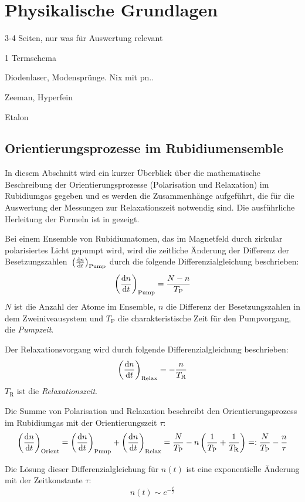 \section{Physikalische Grundlagen}

3-4 Seiten, nur was für Auswertung relevant

1 Termschema

Diodenlaser, Modensprünge. Nix mit pn..

Zeeman, Hyperfein

Etalon

\subsection{Orientierungsprozesse im Rubidiumensemble}
In diesem Abschnitt wird ein kurzer Überblick über die mathematische Beschreibung der Orientierungsprozesse
(Polarisation und Relaxation) im Rubidiumgas gegeben und es werden die Zusammenhänge aufgeführt, die für die
Auswertung der Messungen zur Relaxationszeit notwendig sind.
Die ausführliche Herleitung der Formeln ist in \cite{staatsex} gezeigt.

Bei einem Ensemble von Rubidiumatomen, das im Magnetfeld durch zirkular polarisiertes Licht gepumpt wird,
wird die zeitliche Änderung der Differenz der Besetzungszahlen~$\left(\frac{\mathrm{d} n}{\mathrm{d} t}\right)_{\text{Pump}}$
durch die folgende Differenzialgleichung beschrieben:
\begin{equation}
  \left(\frac{\mathrm{d} n}{\mathrm{d} t}\right)_{\text{Pump}}=\frac{N-n}{T_\text{P}}
\end{equation}
$N$ ist die Anzahl der Atome im Ensemble, $n$ die Differenz der Besetzungszahlen in dem Zweiniveausystem
und $T_\text{P}$ die charakteristische Zeit für den Pumpvorgang, die \emph{Pumpzeit}.

Der Relaxationsvorgang wird durch folgende Differenzialgleichung beschrieben:
\begin{equation}
  \left(\frac{\mathrm{d} n}{\mathrm{d} t}\right)_{\text{Relax}}=-\frac{n}{T_\text{R}}
\end{equation}
$T_\text{R}$ ist die \emph{Relaxationszeit}.

Die Summe von Polarisation und Relaxation beschreibt den Orientierungsprozess im Rubidiumgas mit
der Orientierungszeit $\tau$:
\begin{equation}
\label{eq:orientierungszeit}
  \left(\frac{\mathrm{d} n}{\mathrm{d} t}\right)_{\text{Orient}}
  =\left(\frac{\mathrm{d} n}{\mathrm{d} t}\right)_{\text{Pump}} + \left(\frac{\mathrm{d} n}{\mathrm{d} t}\right)_{\text{Relax}}
  =\frac{N}{T_\text{P}}-n \left( \frac{1}{T_\text{P}} + \frac{1}{T_\text{R}}\right)
  =:\frac{N}{T_\text{P}}- \frac{n}{\tau}
\end{equation}

Die Lösung dieser Differenzialgleichung für $n(t)$ ist eine exponentielle Änderung mit der Zeitkonstante $\tau$:
\begin{equation}
\label{eq:expabhorient}
   n(t) \sim e^{-\frac{t}{\tau}}
\end{equation}


